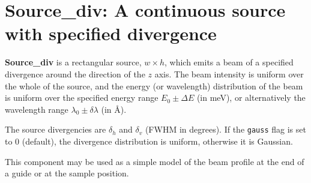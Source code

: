 \section{Source\_div: A continuous source with specified divergence}
\label{source-div}


{\bf Source\_div} is a rectangular source, $w \times h$, which emits a
beam of a specified divergence around the direction of the $z$ axis.
The beam intensity is uniform over
the whole of the source, and the energy (or wavelength) distribution
of the beam is uniform over the specified energy range
$E_0 \pm \Delta E$ (in meV), or alternatively
the wavelength range $\lambda_0 \pm \delta\lambda$ (in \AA ).

The source divergencies are $\delta_h$ and $\delta_v$ (FWHM in degrees).
If the \verb+gauss+ flag is set to 0 (default),
the divergence distribution is uniform, otherwise it is Gaussian.

This component may be used as a simple model of the
beam profile at the end of a guide or at the sample position.

